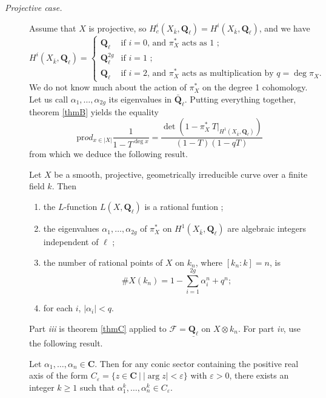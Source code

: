 \begin{description} 
\item[\it Projective case.]
Assume that $X$ is projective, so $H_c^i(X_{\bar k}, \mathbf{Q}_\ell) = H^i(X_{\bar k}, \mathbf{Q}_\ell)$, and we have
$$ 
H^i(X_{\bar k}, \mathbf{Q}_\ell) =
\left\{\begin{array}{ll}
\mathbf{Q}_\ell & \text{if $i = 0$, and $\pi_X^*$ acts as 1 ;} \\
\mathbf{Q}_\ell^{2g} & \text{if $i = 1$ ;} \\
\mathbf{Q}_\ell & \text{if $i = 2$, and $\pi_X^*$ acts as multiplication by $q=\deg \pi_X$.} 
\end{array}\right.
$$
We do not know much about the action of $\pi_X^*$ on the degree 1 cohomology. Let us call $\alpha_1, \ldots, \alpha_{2g}$ its eigenvalues in $\bar{\mathbf{Q}}_\ell$. Putting everything together, theorem \ref{thmB} yields the equality
$$
\text{pr}od_{x\in |X|} \frac{1}{1-T^{\deg x}} = \frac{\det\left(1- \pi_X^*\ T\big|_{H^1(X_{\bar k}, \mathbf{Q}_\ell)}\right)}{(1-T)(1-qT)}
$$
from which we deduce the following result.

\begin{lemma}
Let $X$ be a smooth, projective, geometrically irreducible curve over a finite field $k$. Then
\begin{enumerate}
\item the $L$-function $L(X, \mathbf{Q}_\ell)$ is a rational funtion ;
\item the eigenvalues $\alpha_1, \ldots, \alpha_{2g}$ of $\pi_X^*$ on $H^1(X_{\bar k}, \mathbf{Q}_\ell)$ are algebraic integers independent of $\ell$ ;
\item the number of rational points of $X$ on $k_n$, where $[k_n: k] = n$, is  
$$
\# X(k_n) = 1-\sum_{i=1}^{2g}\alpha_i^n +q^n ; 
$$ 
\item 
for each $i$, $|\alpha_i| < q$. 
\end{enumerate}
\end{lemma}	

Part {\it iii} is theorem \ref{thmC} applied to $\mathcal{F} = \underline{\mathbf{Q}_\ell}$ on $X\otimes k_n$. For part {\it iv}, use the following result.
\begin{exercise}
Let $\alpha_1, \dots, \alpha_n \in \mathbf{C}$. Then for any conic sector containing the positive real axis of the form $C_\varepsilon = \{ z \in \mathbf{C} \ | \ |\arg z| < \varepsilon \}$ with $\varepsilon >0$, there exists an integer $k \geq 1$ such that $\alpha_1^k, \dots, \alpha_n^k \in C_\varepsilon$.
\end{exercise}


\end{description}
